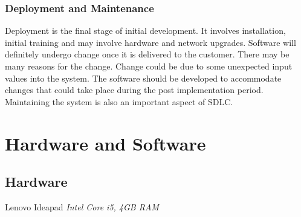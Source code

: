 \documentclass[12pt, a4paper]{report}
\begin{document}
  \subsubsection{Deployment and Maintenance}
  Deployment is the final stage of initial development. It involves installation, initial training and may involve hardware and network upgrades. Software will definitely undergo change once it is delivered to the customer. There may be many reasons for the change. Change could be due to some unexpected input values into the system. The software should be developed to accommodate changes that could take place during the post implementation period. Maintaining the system is also an important aspect of SDLC.
  
  
  \newpage
  \section{Hardware and Software}
    \subsection{Hardware}
    Lenovo Ideapad \newline
    \emph{Intel Core i5, 4GB RAM}
    
\end{document}
